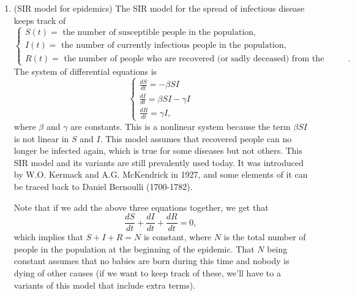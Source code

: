 \documentclass[11pt]{article}
\theoremstyle{definition}
\begin{document}
\begin{enumerate}[leftmargin=*]


\item (SIR model for epidemics)  The SIR model for the spread of infectious disease keeps track of
\[
\begin{cases}
S(t) =\text{ the number of susceptible people in the population},\\
I(t) = \text{ the number of currently infectious people in the population},\\
R(t) = \text{ the number of people who are  recovered (or sadly deceased) from the infection}.
\end{cases}
\]
The system of differential equations is
\[
\begin{cases}
\frac{dS}{dt}=-\beta SI\\
\frac{dI}{dt}= \beta SI-\gamma I\\
\frac{dR}{dt}= \gamma I,
\end{cases}
\]
where $\beta$ and $\gamma$ are constants.   This is a nonlinear system because the term $\beta SI$ is not linear in $S$ and $I$. This model assumes that recovered people can no longer be infected again, which is true for some diseases but not others.   This SIR model and its variants are still prevalently used today.  It was introduced by W.O. Kermack and A.G. McKendrick in 1927, and some elements of it can be traced back to Daniel Bernoulli (1700-1782).

 Note that if we add the above three equations together, we get that 
 \[
 \frac{dS}{dt}+\frac{dI}{dt}+\frac{dR}{dt}=0,
 \]
 which implies that $S+I+R=N$ is constant, where $N$ is the total number of people in the population at the beginning of the epidemic. That $N$ being constant assumes that no babies are born during this time and nobody is dying of other causes (if we want to keep track of these, we'll have to a variants of this model that include extra terms).
 

\end{enumerate}
\end{document}
